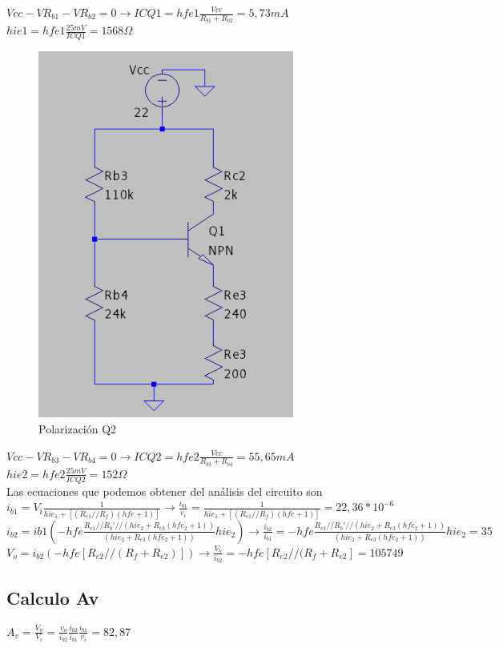 \documentclass[12pt, letterpaper]{article}
\begin{document}
$Vcc-VR_{b1}-VR_{b2}=0 \rightarrow ICQ1=hfe1\frac{Vcc}{R_{b1}+R_{b2}}=5,73mA$
\\
$hie1=hfe1\frac{25mV}{ICQ1}=1568\Omega$
\begin{figure}[h!]
	\centering
	\includegraphics[width=0.75\textwidth]{Imagenes/PolarizaQ2.png}
	\caption{Polarización Q2}
	\label{fig:3}
\end{figure}
$Vcc-VR_{b3}-VR_{b4}=0 \rightarrow ICQ2=hfe2\frac{Vcc}{R_{b3}+R_{b4}}=55,65mA$
\\
$hie2=hfe2\frac{25mV}{ICQ2}=152\Omega$
\\

Las ecuaciones que podemos obtener del análisis del circuito son
\singlespacing
$i_{b1}=V_i\frac{1}{hie_1+[(R_{e1}//R_f)(hfe + 1)]} \rightarrow \frac{i_{b1}}{v_i}=\frac{1}{hie_1+[(R_{e1}//R_f)(hfe + 1)]}=22,36*10^{-6}$
\singlespacing
$ i_{b2}=ib1(-hfe\frac{R_{e1}//R_b'//(hie_2+R_{e3}(hfe_2+1))}{(hie_2+R_{e3}(hfe_2+1))}{hie_2}) \rightarrow \frac{i_{b2}}{i_{b1}}=-hfe\frac{R_{e1}//R_b'//(hie_2+R_{e3}(hfe_2+1))}{(hie_2+R_{e3}(hfe_2+1))}{hie_2}=35$
\singlespacing
$V_o=i_{b2}(-hfe[R_{e2}//(R_f+R_{e2})]) \rightarrow \frac{V_o}{i_{b2}}=-hfe[R_{e2}//(R_f+R_{e2}]=105749$
\subsection{Calculo Av}
$A_v=\frac{V_o}{V_i}=\frac{v_o}{i_{b2}}\frac{i_{b2}}{i_{b1}}\frac{i_{b1}}{v_i}=82,87$
\end{document}
